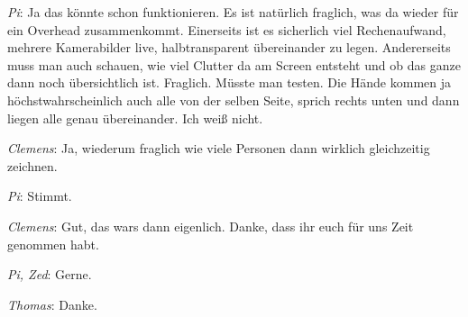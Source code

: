 \medskip \emph{Pi}: Ja das könnte schon funktionieren. Es ist natürlich fraglich, was da wieder für ein Overhead zusammenkommt. Einerseits ist es sicherlich viel Rechenaufwand, mehrere Kamerabilder live, halbtransparent übereinander zu legen. Andererseits muss man auch schauen, wie viel Clutter da am Screen entsteht und ob das ganze dann noch übersichtlich ist. Fraglich. Müsste man testen. Die Hände kommen ja höchstwahrscheinlich auch alle von der selben Seite, sprich rechts unten und dann liegen alle genau übereinander. Ich weiß nicht.

\medskip \emph{Clemens}: Ja, wiederum fraglich wie viele Personen dann wirklich gleichzeitig zeichnen.

\medskip \emph{Pi}: Stimmt.

\medskip \emph{Clemens}: Gut, das wars dann eigenlich. Danke, dass ihr euch für uns Zeit genommen habt.

\medskip \emph{Pi, Zed}: Gerne.

\medskip \emph{Thomas}: Danke.

















